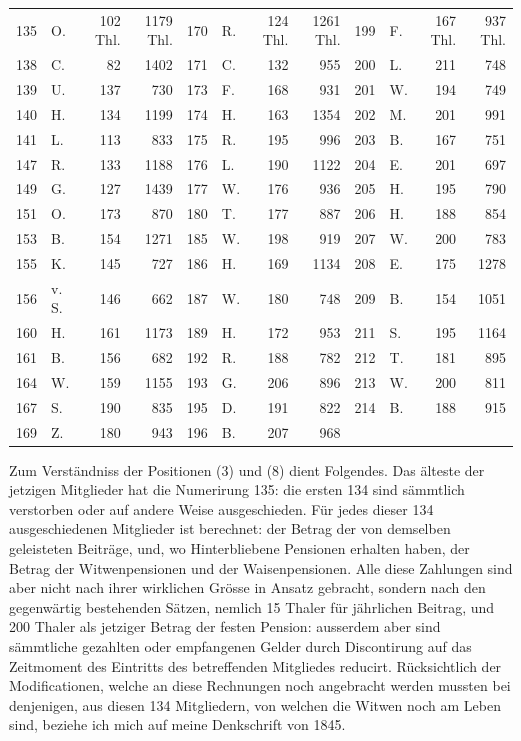 \begin{center}
\footnotesize\setlength{\tabcolsep}{2pt}
\begin{tabular}{r|l|r|r||r|l|r|r||r|l|r|r}
135&O.&102 Thl.&1179 Thl.&170&R.&124 Thl.&1261 Thl.&199&F.&167 Thl.&937 Thl.\\
138&C.&82&1402&171&C.&132&955&200&L.&211&748\\
139&U.&137&730&173&F.&168&931&201&W.&194&749\\
140&H.&134&1199&174&H.&163&1354&202&M.&201&991\\
141&L.&113&833&175&R.&195&996&203&B.&167&751\\
147&R.&133&1188&176&L.&190&1122&204&E.&201&697\\
149&G.&127&1439&177&W.&176&936&205&H.&195&790\\
151&O.&173&870&180&T.&177&887&206&H.&188&854\\
153&B.&154&1271&185&W.&198&919&207&W.&200&783\\
155&K.&145&727&186&H.&169&1134&208&E.&175&1278\\
156&v. S.&146&662&187&W.&180&748&209&B.&154&1051\\
160&H.&161&1173&189&H.&172&953&211&S.&195&1164\\
161&B.&156&682&192&R.&188&782&212&T.&181&895\\
164&W.&159&1155&193&G.&206&896&213&W.&200&811\\
167&S.&190&835&195&D.&191&822&214&B.&188&915\\
169&Z.&180&943&196&B.&207&968&&&&
\end{tabular}
\end{center}
\noindent\hspace*{\parindent}Zum Verständniss der Positionen (3) und (8) dient Folgendes. Das älteste der jetzigen Mitglieder hat die Numerirung 135: die ersten 134 sind sämmtlich verstorben oder auf andere Weise ausgeschieden. Für jedes dieser 134 ausgeschiedenen Mitglieder ist berechnet: der Betrag der von demselben geleisteten Beiträge, und, wo Hinterbliebene Pensionen erhalten haben, der Betrag der Witwenpensionen und der Waisenpensionen. Alle diese Zahlungen sind aber nicht nach ihrer wirklichen Grösse in Ansatz gebracht, sondern nach den gegenwärtig bestehenden Sätzen, nemlich 15 Thaler für jährlichen Beitrag, und 200 Thaler als jetziger Betrag der festen Pension: ausserdem aber sind sämmtliche gezahlten oder empfangenen Gelder durch Discontirung auf das Zeitmoment des Eintritts des betreffenden Mitgliedes reducirt. Rücksichtlich der Modificationen, welche an diese Rechnungen noch angebracht werden mussten bei denjenigen, aus diesen 134 Mitgliedern, von welchen die Witwen noch am Leben sind, beziehe ich mich auf meine Denkschrift von 1845.

